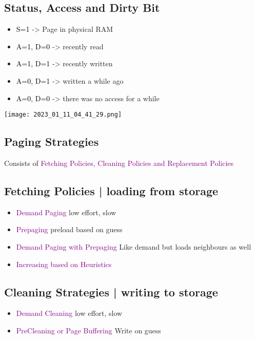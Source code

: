 \documentclass[main.tex,fontsize=8pt,paper=a4,paper=landscape,DIV=calc,]{scrartcl}
\begin{document}
\begin{multicols*}{4}
\subsection{Status, Access and Dirty Bit}
\begin{itemize}
\item \textcolor{black}{S=1} -> Page in physical RAM
\item \textcolor{black}{A=1, D=0} -> recently read
\item \textcolor{black}{A=1, D=1} -> recently written
\item \textcolor{black}{A=0, D=1} -> written a while ago
\item \textcolor{black}{A=0, D=0} -> there was no access for a while
\end{itemize}
\texttt{[image: 2023\_01\_11\_04\_41\_29.png]}

\subsection{Paging Strategies}
Consists of \textcolor{purple}{Fetching Policies, Cleaning Policies and Replacement Policies} 

\subsection{Fetching Policies | loading from storage}
\begin{itemize}
\item \textcolor{purple}{Demand Paging} low effort, slow
\item \textcolor{purple}{Prepaging} preload based on guess
\item \textcolor{purple}{Demand Paging with Prepaging}\newline
  Like demand but loads neighbours as well
\item \textcolor{purple}{Increasing based on Heuristics}
\end{itemize} 

\subsection{Cleaning Strategies | writing to storage}
\begin{itemize}
\item \textcolor{purple}{Demand Cleaning} low effort, slow
\item \textcolor{purple}{PreCleaning or Page Buffering} Write on guess
\end{itemize} 


\end{multicols*}
\end{document}
